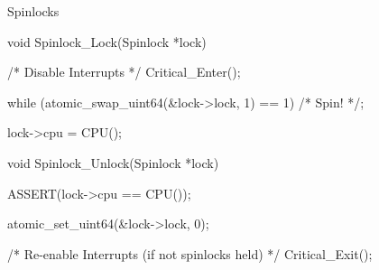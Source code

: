 \documentclass[11pt,aspectratio=169]{beamer}
\begin{document}
\begin{slide}{Spinlocks}
\vspace{-1em}
\begin{ccode}
void Spinlock_Lock(Spinlock *lock)
{
    /* Disable Interrupts */
    Critical_Enter();

    while (atomic_swap_uint64(&lock->lock, 1) == 1)
	/* Spin! */;

    lock->cpu = CPU();
}
void Spinlock_Unlock(Spinlock *lock)
{
    ASSERT(lock->cpu == CPU());

    atomic_set_uint64(&lock->lock, 0);

    /* Re-enable Interrupts (if not spinlocks held) */
    Critical_Exit();
}
\end{ccode}
\end{slide}

%
%
\end{document}
